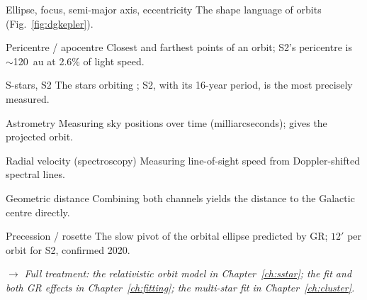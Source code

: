 \begin{termsbox}
\item[Ellipse, focus, semi-major axis, eccentricity] The shape language
of orbits (Fig.~\ref{fig:dgkepler}).
\item[Pericentre / apocentre] Closest and farthest points of an orbit;
S2's pericentre is $\sim$120~au at 2.6\% of light speed.
\item[S-stars, S2] The stars orbiting \sgra{}; S2, with its 16-year
period, is the most precisely measured.
\item[Astrometry] Measuring sky positions over time (milliarcseconds);
gives the projected orbit.
\item[Radial velocity (spectroscopy)] Measuring line-of-sight speed from
Doppler-shifted spectral lines.
\item[Geometric distance] Combining both channels yields the distance to
the Galactic centre directly.
\item[Precession / rosette] The slow pivot of the orbital ellipse
predicted by GR; $12'$ per orbit for S2, confirmed 2020.
\end{termsbox}

\noindent$\rightarrow$ \emph{Full treatment: the relativistic orbit
model in Chapter~\ref{ch:sstar}; the fit and both GR effects in
Chapter~\ref{ch:fitting}; the multi-star fit in
Chapter~\ref{ch:cluster}.}
